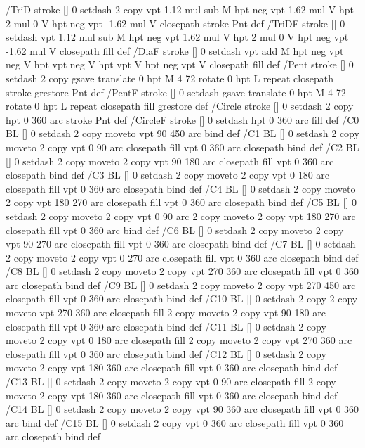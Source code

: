 /TriD {stroke [] 0 setdash 2 copy vpt 1.12 mul sub M
  hpt neg vpt 1.62 mul V
  hpt 2 mul 0 V
  hpt neg vpt -1.62 mul V closepath stroke
  Pnt} def
/TriDF {stroke [] 0 setdash vpt 1.12 mul sub M
  hpt neg vpt 1.62 mul V
  hpt 2 mul 0 V
  hpt neg vpt -1.62 mul V closepath fill} def
/DiaF {stroke [] 0 setdash vpt add M
  hpt neg vpt neg V hpt vpt neg V
  hpt vpt V hpt neg vpt V closepath fill} def
/Pent {stroke [] 0 setdash 2 copy gsave
  translate 0 hpt M 4 {72 rotate 0 hpt L} repeat
  closepath stroke grestore Pnt} def
/PentF {stroke [] 0 setdash gsave
  translate 0 hpt M 4 {72 rotate 0 hpt L} repeat
  closepath fill grestore} def
/Circle {stroke [] 0 setdash 2 copy
  hpt 0 360 arc stroke Pnt} def
/CircleF {stroke [] 0 setdash hpt 0 360 arc fill} def
/C0 {BL [] 0 setdash 2 copy moveto vpt 90 450 arc} bind def
/C1 {BL [] 0 setdash 2 copy moveto
	2 copy vpt 0 90 arc closepath fill
	vpt 0 360 arc closepath} bind def
/C2 {BL [] 0 setdash 2 copy moveto
	2 copy vpt 90 180 arc closepath fill
	vpt 0 360 arc closepath} bind def
/C3 {BL [] 0 setdash 2 copy moveto
	2 copy vpt 0 180 arc closepath fill
	vpt 0 360 arc closepath} bind def
/C4 {BL [] 0 setdash 2 copy moveto
	2 copy vpt 180 270 arc closepath fill
	vpt 0 360 arc closepath} bind def
/C5 {BL [] 0 setdash 2 copy moveto
	2 copy vpt 0 90 arc
	2 copy moveto
	2 copy vpt 180 270 arc closepath fill
	vpt 0 360 arc} bind def
/C6 {BL [] 0 setdash 2 copy moveto
	2 copy vpt 90 270 arc closepath fill
	vpt 0 360 arc closepath} bind def
/C7 {BL [] 0 setdash 2 copy moveto
	2 copy vpt 0 270 arc closepath fill
	vpt 0 360 arc closepath} bind def
/C8 {BL [] 0 setdash 2 copy moveto
	2 copy vpt 270 360 arc closepath fill
	vpt 0 360 arc closepath} bind def
/C9 {BL [] 0 setdash 2 copy moveto
	2 copy vpt 270 450 arc closepath fill
	vpt 0 360 arc closepath} bind def
/C10 {BL [] 0 setdash 2 copy 2 copy moveto vpt 270 360 arc closepath fill
	2 copy moveto
	2 copy vpt 90 180 arc closepath fill
	vpt 0 360 arc closepath} bind def
/C11 {BL [] 0 setdash 2 copy moveto
	2 copy vpt 0 180 arc closepath fill
	2 copy moveto
	2 copy vpt 270 360 arc closepath fill
	vpt 0 360 arc closepath} bind def
/C12 {BL [] 0 setdash 2 copy moveto
	2 copy vpt 180 360 arc closepath fill
	vpt 0 360 arc closepath} bind def
/C13 {BL [] 0 setdash 2 copy moveto
	2 copy vpt 0 90 arc closepath fill
	2 copy moveto
	2 copy vpt 180 360 arc closepath fill
	vpt 0 360 arc closepath} bind def
/C14 {BL [] 0 setdash 2 copy moveto
	2 copy vpt 90 360 arc closepath fill
	vpt 0 360 arc} bind def
/C15 {BL [] 0 setdash 2 copy vpt 0 360 arc closepath fill
	vpt 0 360 arc closepath} bind def
